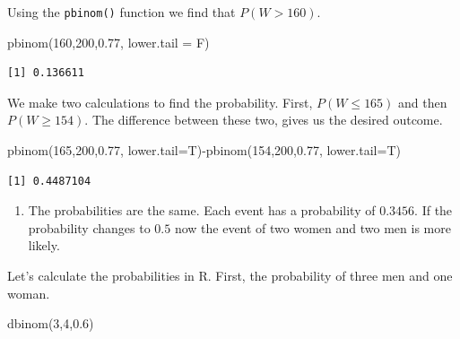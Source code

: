 \documentclass[
  letterpaper,
  DIV=11,
  numbers=noendperiod]{scrreprt}
\newenvironment{Shaded}{\begin{snugshade}}{\end{snugshade}}
\newcommand{\AttributeTok}[1]{\textcolor[rgb]{0.40,0.45,0.13}{#1}}
\newcommand{\DecValTok}[1]{\textcolor[rgb]{0.68,0.00,0.00}{#1}}
\newcommand{\FloatTok}[1]{\textcolor[rgb]{0.68,0.00,0.00}{#1}}
\newcommand{\FunctionTok}[1]{\textcolor[rgb]{0.28,0.35,0.67}{#1}}
\newcommand{\NormalTok}[1]{\textcolor[rgb]{0.00,0.23,0.31}{#1}}
\newcommand{\SpecialCharTok}[1]{\textcolor[rgb]{0.37,0.37,0.37}{#1}}
\providecommand{\tightlist}{%
  \setlength{\itemsep}{0pt}\setlength{\parskip}{0pt}}\usepackage{longtable,booktabs,array}
\begin{document}
Using the \texttt{pbinom()} function we find that \(P(W>160)\).

\begin{Shaded}
\begin{Highlighting}[numbers=left,,]
\FunctionTok{pbinom}\NormalTok{(}\DecValTok{160}\NormalTok{,}\DecValTok{200}\NormalTok{,}\FloatTok{0.77}\NormalTok{, }\AttributeTok{lower.tail =}\NormalTok{ F)}
\end{Highlighting}
\end{Shaded}

\begin{verbatim}
[1] 0.136611
\end{verbatim}

We make two calculations to find the probability. First,
\(P(W \leq 165)\) and then \(P(W \geq 154)\). The difference between
these two, gives us the desired outcome.

\begin{Shaded}
\begin{Highlighting}[numbers=left,,]
\FunctionTok{pbinom}\NormalTok{(}\DecValTok{165}\NormalTok{,}\DecValTok{200}\NormalTok{,}\FloatTok{0.77}\NormalTok{, }\AttributeTok{lower.tail=}\NormalTok{T)}\SpecialCharTok{{-}}\FunctionTok{pbinom}\NormalTok{(}\DecValTok{154}\NormalTok{,}\DecValTok{200}\NormalTok{,}\FloatTok{0.77}\NormalTok{, }\AttributeTok{lower.tail=}\NormalTok{T)}
\end{Highlighting}
\end{Shaded}

\begin{verbatim}
[1] 0.4487104
\end{verbatim}

\begin{blackbox}

\begin{enumerate}
\def\labelenumi{\arabic{enumi}.}
\setcounter{enumi}{2}
\tightlist
\item
  The probabilities are the same. Each event has a probability of
  \(0.3456\). If the probability changes to \(0.5\) now the event of two
  women and two men is more likely.
\end{enumerate}

\end{blackbox}

Let's calculate the probabilities in R. First, the probability of three
men and one woman.

\begin{Shaded}
\begin{Highlighting}[numbers=left,,]
\FunctionTok{dbinom}\NormalTok{(}\DecValTok{3}\NormalTok{,}\DecValTok{4}\NormalTok{,}\FloatTok{0.6}\NormalTok{)}
\end{Highlighting}
\end{Shaded}
\end{document}
